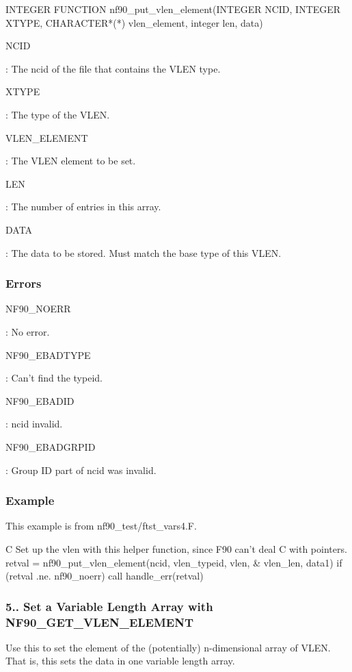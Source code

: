 \begin{DoxyCode}
\textcolor{keyword}{INTEGER }\textcolor{keyword}{FUNCTION }nf90\_put\_vlen\_element(INTEGER NCID, INTEGER XTYPE,
        CHARACTER*(*) vlen\_element, integer len, data)
\end{DoxyCode}


{\ttfamily N\+C\+ID}

\+: The ncid of the file that contains the V\+L\+EN type.

{\ttfamily X\+T\+Y\+PE}

\+: The type of the V\+L\+EN.

{\ttfamily V\+L\+E\+N\+\_\+\+E\+L\+E\+M\+E\+NT}

\+: The V\+L\+EN element to be set.

{\ttfamily L\+EN}

\+: The number of entries in this array.

{\ttfamily D\+A\+TA}

\+: The data to be stored. Must match the base type of this V\+L\+EN.

\subsubsection*{Errors}

{\ttfamily N\+F90\+\_\+\+N\+O\+E\+RR}

\+: No error.

{\ttfamily N\+F90\+\_\+\+E\+B\+A\+D\+T\+Y\+PE}

\+: Can’t find the typeid.

{\ttfamily N\+F90\+\_\+\+E\+B\+A\+D\+ID}

\+: ncid invalid.

{\ttfamily N\+F90\+\_\+\+E\+B\+A\+D\+G\+R\+P\+ID}

\+: Group ID part of ncid was invalid.

\subsubsection*{Example}

This example is from nf90\+\_\+test/ftst\+\_\+vars4.\+F.


\begin{DoxyCode}
\textcolor{comment}{C     Set up the vlen with this helper function, since F90 can't deal}
\textcolor{comment}{C     with pointers.}
      retval = nf90\_put\_vlen\_element(ncid, vlen\_typeid, vlen,
     &     vlen\_len, data1)
      \textcolor{keywordflow}{if} (retval .ne. nf90\_noerr) \textcolor{keyword}{call }handle\_err(retval)
\end{DoxyCode}
\hypertarget{f90-user-defined-data-types_f90-set-a-variable-length-array-with-nf90_get_vlen_element}{}\subsubsection{5.. Set a Variable Length Array with N\+F90\+\_\+\+G\+E\+T\+\_\+\+V\+L\+E\+N\+\_\+\+E\+L\+E\+M\+E\+NT}\label{f90-user-defined-data-types_f90-set-a-variable-length-array-with-nf90_get_vlen_element}
Use this to set the element of the (potentially) n-\/dimensional array of V\+L\+EN. That is, this sets the data in one variable length array.

